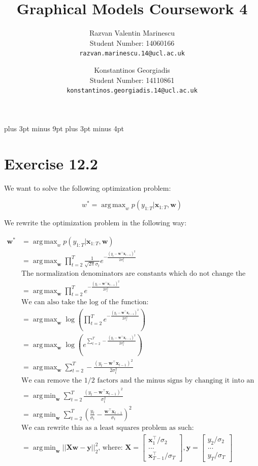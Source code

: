 \documentclass[11pt,a4paper,oneside]{report}
\title{Graphical Models Coursework 4}
\author{
Razvan Valentin Marinescu\\
Student Number: 14060166\\
\texttt{razvan.marinescu.14@ucl.ac.uk}
\and
Konstantinos Georgiadis\\
Student Number: 14110861\\
\texttt{konstantinos.georgiadis.14@ucl.ac.uk}
}
\DeclareMathOperator*{\argmin}{arg\,min}
\DeclareMathOperator*{\argmax}{arg\,max}
\begin{document}
\belowdisplayskip=12pt plus 3pt minus 9pt
\belowdisplayshortskip=7pt plus 3pt minus 4pt
\maketitle{}

\section*{Exercise 12.2}

We want to solve the following optimization problem:

$$w^\ast=\argmax_{w}p(y_{1:T}|\mathbf{x}_{1:T},\mathbf{w})$$

We rewrite the optimization problem in the following way:

\begin{align*}
\mathbf{w}^\ast&=\argmax_{w}p(y_{1:T}|\mathbf{x}_{1:T},\mathbf{w})\\
&=\argmax_{\mathbf{w}}\prod_{t=2}^T\frac{1}{\sqrt{2\pi}\sigma_t}e^{-\frac{(y_t-\mathbf{w}^\top\mathbf{x}_{t-1})^2}{2\sigma_t^2}}\\
&\text{The normalization denominators are constants which do not change the solution:}\\
&=\argmax_{\mathbf{w}}\prod_{t=2}^Te^{-\frac{(y_t-\mathbf{w}^\top\mathbf{x}_{t-1})^2}{2\sigma_t^2}}\\
&\text{We can also take the log of the function:}\\
&=\argmax_{\mathbf{w}}\log\left(\prod_{t=2}^Te^{-\frac{(y_t-\mathbf{w}^\top\mathbf{x}_{t-1})^2}{2\sigma_t^2}}\right)\\
&=\argmax_{\mathbf{w}}\log\left(e^{\sum_{t=2}^T-\frac{(y_t-\mathbf{w}^\top\mathbf{x}_{t-1})^2}{2\sigma_t^2}}\right)\\
&=\argmax_{\mathbf{w}}\sum_{t=2}^T-\frac{(y_t-\mathbf{w}^\top\mathbf{x}_{t-1})^2}{2\sigma_t^2}\\
&\text{We can remove the 1/2 factors and the minus signs by changing it into an argmin:}\\
&=\argmin_{\mathbf{w}}\sum_{t=2}^T\frac{(y_t-\mathbf{w}^\top\mathbf{x}_{t-1})^2}{\sigma_t^2}\\
&=\argmin_{\mathbf{w}}\sum_{t=2}^T\left(\frac{y_t}{\sigma_t}-\frac{\mathbf{w}^\top\mathbf{x}_{t-1}}{\sigma_t}\right)^2\\
&\text{We can rewrite this as a least squares problem as such:}\\
&=\argmin_{\mathbf{w}}||\mathbf{X}\mathbf{w}-\mathbf{y}||_2^2\text{, where: }\mathbf{X}=\left[ { \begin{array}{c} \mathbf{x}_1^\top/\sigma_2\\ ... \\ \mathbf{x}_{T-1}^\top/\sigma_T  \end{array} } \right], \mathbf{y}=\left[ { \begin{array}{c} y_2/\sigma_2\\ ... \\ y_{T}/\sigma_T  \end{array} } \right]\\

\end{align*}
\end{document}

